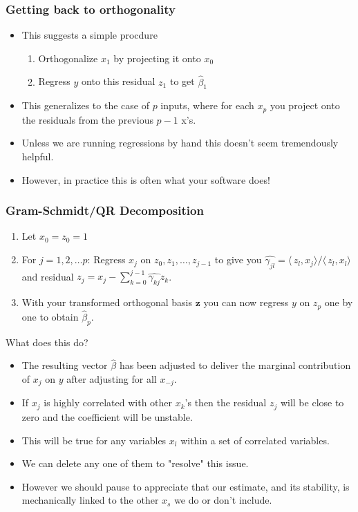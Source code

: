 \begin{frame}
\frametitle{Getting back to orthogonality}
\begin{itemize}
\item This suggests a simple procdure 
\begin{enumerate}
    \item Orthogonalize $x_1$ by projecting it onto $x_0$
    \item Regress $y$ onto this residual $z_1$ to get $\hat \beta_1$
\end{enumerate}
\item This generalizes to the case of $p$ inputs, where for each $x_p$ you project onto the residuals from the previous $p-1$ x's. 
\item Unless we are running regressions by hand this doesn't seem tremendously helpful.
\item However, in practice this is often what your software does!
\end{itemize}
\end{frame}

\begin{frame}[allowframebreaks]
\frametitle{Gram-Schmidt/QR Decomposition}
\begin{enumerate}
\item Let $x_0 = z_0 = 1$
\item For $j = 1,2,\ldots p$: Regress $x_j$ on $z_0,z_1,\ldots,z_{j-1}$  to give you $\hat{\gamma_{jl}} = \langle\, z_l, x_j \rangle/\langle\, z_l, x_l \rangle$ and residual $z_j = x_j  - \sum_{k=0}^{j-1} \hat{\gamma_{kj}} z_k$.
\item With your transformed orthogonal basis $\mathbf{z}$ you can now regress $y$ on $z_p$ one by one to obtain $\hat{\beta}_p$.
\end{enumerate}

\framebreak 

What does this do?
\begin{itemize}
\item The resulting vector $\hat{\beta}$ has been adjusted to deliver the marginal contribution of $x_j$ on $y$ after adjusting for all $x_{-j}$.
\item If $x_j$ is highly correlated with other $x_k$'s then the residual $z_j$ will be close to zero and the coefficient will be unstable.
\item This will be true for any variables $x_l$ within a set of correlated variables.
\item We can delete any one of them to "resolve" this issue.
\item However we should pause to appreciate that our estimate, and its stability, is mechanically linked to the other $x_s$ we do or don't include. 
\end{itemize}
\end{frame}


